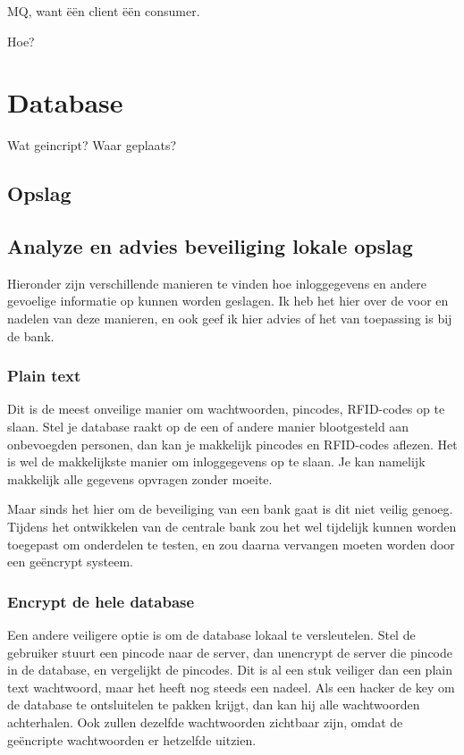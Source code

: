 \documentclass{article}
\begin{document}
MQ, want \"e\"en client \"e\"en consumer.

Hoe?

\section{Database}

Wat geincript?
Waar geplaats?

\newpage

\subsection{Opslag}

\subsection{Analyze en advies beveiliging lokale opslag} 

Hieronder zijn verschillende manieren te vinden hoe inloggegevens en andere gevoelige informatie op kunnen worden geslagen.
Ik heb het hier over de voor en nadelen van deze manieren, en ook geef ik hier advies of het van toepassing is bij de bank.

\subsubsection{Plain text}

Dit is de meest onveilige manier om wachtwoorden, pincodes, RFID-codes op te slaan.
Stel je database raakt op de een of andere manier blootgesteld aan onbevoegden personen, dan kan je makkelijk pincodes en RFID-codes aflezen. 
Het is wel de makkelijkste manier om inloggegevens op te slaan.
Je kan namelijk makkelijk alle gegevens opvragen zonder moeite.

Maar sinds het hier om de beveiliging van een bank gaat is dit niet veilig genoeg.
Tijdens het ontwikkelen van de centrale bank zou het wel tijdelijk kunnen worden toegepast om onderdelen te testen, en zou daarna vervangen moeten worden door een ge\"encrypt systeem.

\subsubsection{Encrypt de hele database}

Een andere veiligere optie is om de database lokaal te versleutelen.
Stel de gebruiker stuurt een pincode naar de server, dan unencrypt de server die pincode in de database, en vergelijkt de pincodes.
Dit is al een stuk veiliger dan een plain text wachtwoord, maar het heeft nog steeds een nadeel.
Als een hacker de key om de database te ontsluitelen te pakken krijgt, dan kan hij alle wachtwoorden achterhalen.
Ook zullen dezelfde wachtwoorden zichtbaar zijn, omdat de ge\"encripte wachtwoorden er hetzelfde uitzien.
\end{document}
